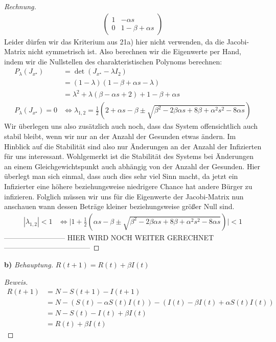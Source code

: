 \documentclass[a4paper]{article}
\newcommand{\beh}{\textit{Behauptung. }}
\begin{document}
\begin{theorem}
\begin{proof}[Rechnung]
\begin{align*}
\begin{pmatrix}
			1 & - \alpha s \\
			0 & 1 - \beta + \alpha s
		\end{pmatrix} 
	\end{align*}
	Leider dürfen wir das Kriterium aus 21a) hier nicht verwenden, da die Jacobi-Matrix nicht symmetrisch ist.
	Also berechnen wir die Eigenwerte per Hand, indem wir die Nullstellen des charakteristischen Polynoms
	berechnen:
	\begin{align*}
		P_\lambda (J_{x ^{\star}}) &=
		\det (J_{x ^{\star}} - \lambda I_2) \\
			   &= (1 - \lambda) (1 - \beta + \alpha s - \lambda ) \\
			   &= \lambda ^2 + \lambda \left(
				\beta - \alpha s + 2
			   \right) + 1 - \beta + \alpha s \\
		P_\lambda (J_{x ^{\star}}) = 0 & \Leftrightarrow
		\lambda_{1, 2} = \frac{ 1 }{ 2 } \left(
			2 + \alpha s - \beta \pm \sqrt{
				\beta ^2 - 2 \beta \alpha s + 8 \beta + \alpha ^2 s ^2 - 8 \alpha s
			} 
		\right) 
	\end{align*}
	Wir überlegen uns also zusätzlich auch noch, dass das System offensichtlich auch stabil bleibt,
	wenn wir nur an der Anzahl der Gesunden etwas ändern. Im Hinblick auf die Stabilität sind
	also nur Änderungen an der Anzahl der Infizierten für uns interessant.
	Wohlgemerkt ist die Stabilität des Systems bei Änderungen an einem Gleichgewichtspunkt
	auch abhängig von der Anzahl der Gesunden. Hier überlegt man sich einmal, dass auch dies sehr
	viel Sinn macht, da jetzt ein Infizierter eine höhere beziehungsweise niedrigere Chance
	hat andere Bürger zu infizieren.
	Folglich müssen wir uns für die Eigenwerte der Jacobi-Matrix nun anschauen wann dessen Beträge
	kleiner beziehungsweise größer Null sind.
	\begin{align*}
		| \lambda_{1, 2} | < 1 & \Leftrightarrow
		\Big | 1 + \frac{ 1 }{ 2 } \left(
			\alpha s - \beta \pm \sqrt{
				\beta ^2 - 2 \beta \alpha s + 8 \beta + \alpha ^2 s ^2 - 8 \alpha s
			} 
		\right) \Big | < 1
	\end{align*}
	-------------------------- HIER WIRD NOCH WEITER GERECHNET ------------------------------------
\end{proof}
\end{theorem}

\textbf{b)} \beh $R(t+1) = R(t) + \beta I(t)$

\begin{proof}[Beweis]
	\begin{align*}
		R(t+1) &= N - S(t+1) - I(t+1) \\
			   &= N - \left(
				   S(t) - \alpha S(t) I(t)
			   \right) - \left(
			   I(t) - \beta I(t) + \alpha S(t) I(t)
			   \right) \\
			   &= N - S(t) - I(t) + \beta I(t) \\
			   &= R(t) + \beta I(t)
	\end{align*}
\end{proof}
\end{document}
